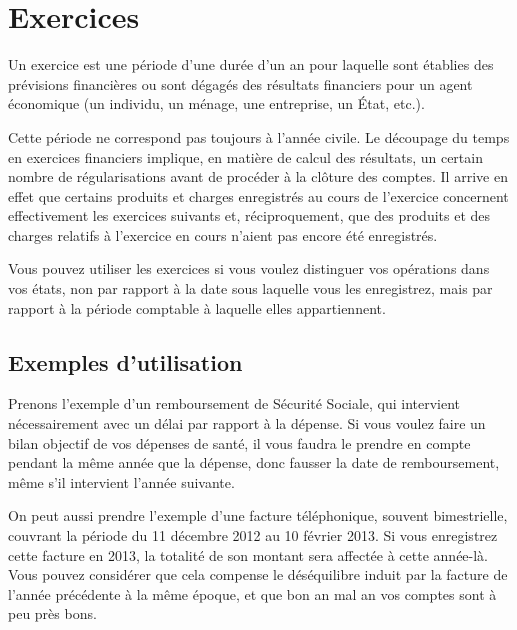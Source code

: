 
\chapter{Exercices\label{financialyear}}


Un exercice est une période d'une durée d'un an pour laquelle sont établies des prévisions financières ou sont dégagés des résultats financiers pour un agent économique (un individu, un ménage, une entreprise, un État, etc.).

Cette période ne correspond pas toujours à l'année civile. Le découpage du temps en exercices financiers implique, en matière de calcul des résultats, un certain nombre de régularisations avant de procéder à la clôture des comptes. Il arrive en effet que certains produits et charges enregistrés au cours de l'exercice concernent effectivement les exercices suivants et, réciproquement, que des produits et des charges relatifs à l'exercice en cours n'aient pas encore été enregistrés.

Vous pouvez utiliser les exercices si vous voulez distinguer vos opérations dans vos états, non par rapport à la date sous laquelle vous les enregistrez, mais par rapport à la période comptable à laquelle elles appartiennent.


\section{Exemples d'utilisation}


Prenons l'exemple d'un remboursement de Sécurité Sociale, qui intervient nécessairement avec un délai par rapport à la dépense. Si vous voulez faire un bilan objectif de vos dépenses de santé, il vous faudra le prendre en compte pendant la même année que la dépense, donc fausser la date de  remboursement, même s'il intervient l'année suivante. 

On peut aussi prendre l'exemple d'une facture téléphonique, souvent bimestrielle, couvrant la période du 11 décembre 2012 au 10 février 2013. Si vous enregistrez cette facture en 2013, la totalité de son montant sera affectée à cette année-là. Vous pouvez considérer que cela compense le déséquilibre induit par la facture de l'année précédente à la même époque, et que bon an mal an vos comptes sont à peu près bons.

